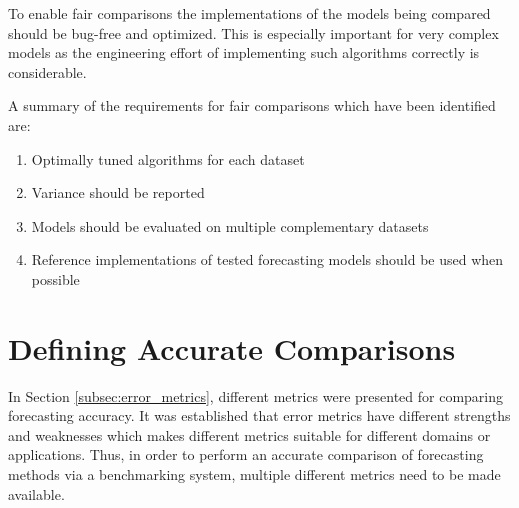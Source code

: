 To enable fair comparisons the implementations of the models being compared should be bug-free and optimized. This is especially important for very complex models as the engineering effort of implementing such algorithms correctly is considerable.

A summary of the requirements for fair comparisons which have been identified are:

\begin{enumerate}
  \item Optimally tuned algorithms for each dataset
  \item Variance should be reported
  \item Models should be evaluated on multiple complementary datasets
  \item Reference implementations of tested forecasting models should be used when possible
\end{enumerate}

\section{Defining Accurate Comparisons}
In Section \ref{subsec:error_metrics}, different metrics were presented for comparing forecasting accuracy. It was established that error metrics have different strengths and weaknesses which makes different metrics suitable for different domains or applications.
Thus, in order to perform an accurate comparison of forecasting methods via a benchmarking system, multiple different metrics need to be made available.

